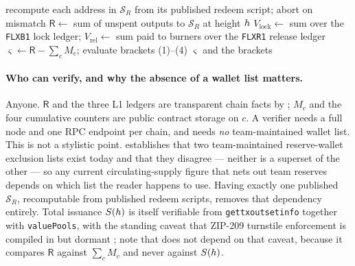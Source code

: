\begin{algorithm}[H]
\caption{Public verification of the reserve invariant. Runnable by anyone. \planned}
\label{alg:verify}
\BlankLine
recompute each address in $\mathcal{S}_R$ from its published redeem script; abort on mismatch\;
$\mathsf{R} \leftarrow$ sum of unspent outputs to $\mathcal{S}_R$ at height $h$\;
$V_{\mathrm{lock}} \leftarrow$ sum over the \texttt{FLXB1} lock ledger;\quad
$V_{\mathrm{rel}} \leftarrow$ sum paid to burners over the \texttt{FLXR1} release ledger\;
$\varsigma \leftarrow \mathsf{R} - \sum_c M_c$; evaluate brackets (1)--(4)\;
\Return $\varsigma$ and the brackets\;
\end{algorithm}

\paragraph{Who can verify, and why the absence of a wallet list matters.} Anyone. $\mathsf{R}$ and
the three L1 ledgers are transparent chain facts by ; $M_c$ and the four
cumulative counters are public contract storage on $c$. A verifier needs a \Flux full node and one
RPC endpoint per chain, and needs \emph{no} team-maintained wallet list. This is not a stylistic
point.  establishes that two team-maintained reserve-wallet exclusion
lists exist today and that they disagree --- neither is a superset of the other --- so any current
circulating-supply figure that nets out team reserves depends on which list the reader happens to
use. Having exactly one published $\mathcal{S}_R$, recomputable from published redeem scripts,
removes that dependency entirely. Total issuance $S(h)$ is itself verifiable from
\texttt{gettxoutsetinfo} together with \texttt{valuePools}, with the standing caveat that ZIP-209
turnstile enforcement is compiled in but dormant
; note that  does not
depend on that caveat, because it compares $\mathsf{R}$ against $\sum_c M_c$ and never against
$S(h)$.

